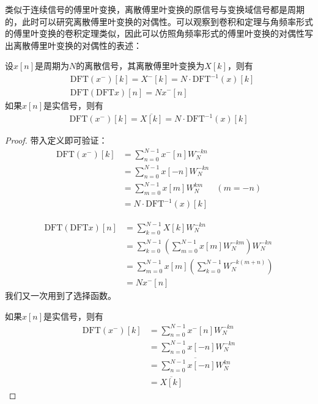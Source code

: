 \documentclass{ctexbook}
\begin{document}
类似于连续信号的傅里叶变换，离散傅里叶变换的原信号与变换域信号都是周期的，此时可以研究离散傅里叶变换的对偶性。可以观察到卷积和定理与角频率形式的傅里叶变换的卷积定理类似，因此可以仿照角频率形式的傅里叶变换的对偶性写出离散傅里叶变换的对偶性的表述：
\begin{proposition}[离散傅里叶变换的对偶性]
    设$x[n]$是周期为$N$的离散信号，其离散傅里叶变换为$X[k]$，则有
    \begin{align*}
        &\text{DFT}(x^-)[k]=X^-[k]=N\cdot\text{DFT}^{-1}(x)[k]\\
        &\text{DFT}\left(\text{DFT}x\right)[n]=N x^- [n]
    \end{align*}
    如果$x[n]$是实信号，则有
    \begin{align*}
        \text{DFT}(x^-)[k]=\overline{X[k]}=N\cdot\text{DFT}^{-1}(x)[k]
    \end{align*}
\end{proposition}
\begin{proof}
    带入定义即可验证：
    \begin{align*}
        \text{DFT}(x^-)[k]&=\sum_{n=0}^{N-1}x^- [n]W_N^{-kn}\\
        &=\sum_{n=0}^{N-1}x[-n]W_N^{-kn}\\
        &=\sum_{m=0}^{N-1}x[m]W_N^{km}&(m=-n)\\
        &=N\cdot\text{DFT}^{-1}(x)[k]
    \end{align*}

    \begin{align*}
        \text{DFT}\left(\text{DFT}x\right)[n]&=\sum_{k=0}^{N-1}X[k]W_N^{-kn}\\
        &=\sum_{k=0}^{N-1}\left(\sum_{m=0}^{N-1}x[m]W_N^{-km}\right)W_N^{-kn}\\
        &=\sum_{m=0}^{N-1}x[m]\left(\sum_{k=0}^{N-1}W_N^{-k(m+n)}\right)\\
        &=N x^- [n]
    \end{align*}
    我们又一次用到了选择函数。

    如果$x[n]$是实信号，则有
    \begin{align*}
        \text{DFT}(x^-)[k]&=\sum_{n=0}^{N-1}x^- [n]W_N^{-kn}\\
        &=\sum_{n=0}^{N-1}x[-n]W_N^{-kn}\\
        &=\overline{\sum_{n=0}^{N-1}x[-n]W_N^{kn}}\\
        &=\overline{X[k]}
    \end{align*}
\end{proof}
\end{document}
